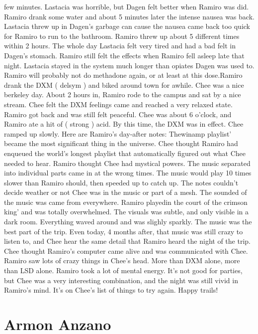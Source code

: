 \documentclass[12pt]{book}
\begin{document}
few minutes. Lastacia was horrible, but Dagen felt better when Ramiro was did. Ramiro drank some water and about 5 minutes later the intense nausea was back. Lastacia threw up in Dagen's garbage can cause the nausea came back too quick for Ramiro to run to the bathroom. Ramiro threw up about 5 different times within 2 hours. The whole day Lastacia felt very tired and had a bad felt in Dagen's stomach. Ramiro still felt the effects when Ramiro fell asleep late that night. Lastacia stayed in the system much longer than opiates Dagen was used to. Ramiro will probably not do methadone again, or at least at this dose.Ramiro drank the DXM ( delsym ) and biked around town for awhile. Chee was a nice berkeley day. About 2 hours in, Ramiro rode to the campus and sat by a nice stream. Chee felt the DXM feelings came and reached a very relaxed state. Ramiro got back and was still felt peaceful. Chee was about 6 o'clock, and Ramiro ate a hit of ( strong ) acid. By this time, the DXM was in effect. Chee ramped up slowly. Here are Ramiro's day-after notes: Thewinamp playlist' became the most significant thing in the universe. Chee thought Ramiro had enqueued the world's longest playlist that automatically figured out what Chee needed to hear. Ramiro thought Chee had mystical powers. The music separated into individual parts came in at the wrong times. The music would play 10 times slower than Ramiro should, then speeded up to catch up. The notes couldn't decide weather or not Chee was in the music or part of a mesh. The sounded of the music was came from everywhere. Ramiro playedin the court of the crimson king' and was totally overwhelmed. The visuals was subtle, and only visible in a dark room. Everything waved around and was slighly sparkly. The music was the best part of the trip. Even today, 4 months after, that music was still crazy to listen to, and Chee hear the same detail that Ramiro heard the night of the trip. Chee thought Ramiro's computer came alive and was communicated with Chee. Ramiro saw lots of crazy things in Chee's head. More than DXM alone, more than LSD alone. Ramiro took a lot of mental energy. It's not good for parties, but Chee was a very interesting combination, and the night was still vivid in Ramiro's mind. It's on Chee's list of things to try again. Happy trails!



\chapter{Armon Anzano}
\end{document}
